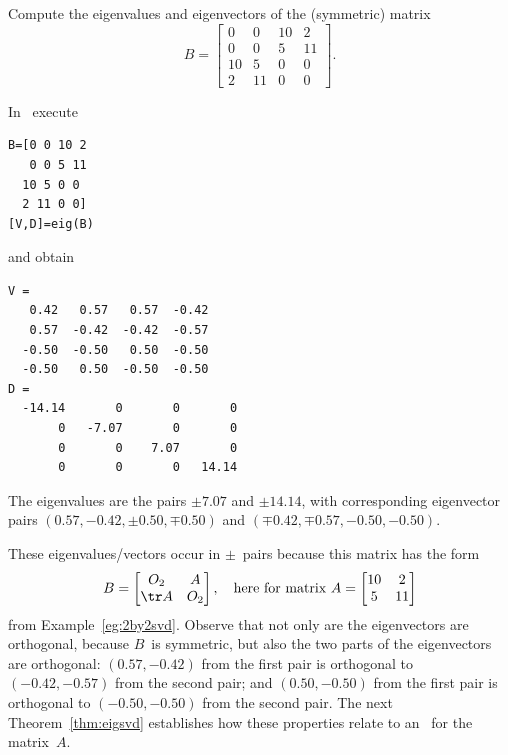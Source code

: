\begin{example} \label{eg:eigsvd}
Compute the eigenvalues and eigenvectors of the (symmetric) matrix
\begin{equation*}
B=\begin{bmatrix} 0&0&10&2\\
0&0&5&11\\
10&5&0&0\\
2&11&0&0 \end{bmatrix}.
\end{equation*}
\begin{solution} In \script\ execute
\setbox\ajrqrbox\hbox{}%
\marginpar{\usebox{\ajrqrbox}}%
\begin{verbatim}
B=[0 0 10 2
   0 0 5 11
  10 5 0 0
  2 11 0 0]
[V,D]=eig(B)
\end{verbatim}
and obtain \twodp
\begin{verbatim}
V =
   0.42   0.57   0.57  -0.42
   0.57  -0.42  -0.42  -0.57
  -0.50  -0.50   0.50  -0.50
  -0.50   0.50  -0.50  -0.50
D =
  -14.14       0       0       0
       0   -7.07       0       0
       0       0    7.07       0
       0       0       0   14.14
\end{verbatim}
The eigenvalues are the pairs \(\pm7.07\) and \(\pm14.14\), with corresponding eigenvector pairs \((0.57,-0.42,\pm0.50,\mp0.50)\) and \((\mp0.42,\mp0.57,-0.50,-0.50)\).
\end{solution}
These eigenvalues\slash vectors occur in \(\pm\)~pairs because this matrix has the form
\begin{equation*}
B=\begin{bmatrix} O_2& A\\ \tr A&O_2\end{bmatrix},
\quad\text{here for matrix }
A=\begin{bmatrix} 10&2\\5&11 \end{bmatrix}
\end{equation*}
from Example~\ref{eg:2by2svd}.
Observe that not only are the eigenvectors are orthogonal, because \(B\)~is symmetric, but also the two parts of the eigenvectors are orthogonal:  \((0.57,-0.42)\) from the first pair is orthogonal to \((-0.42,-0.57)\) from the second pair; and \((0.50,-0.50)\) from the first pair is orthogonal to \((-0.50,-0.50)\) from the second pair.
The next Theorem~\ref{thm:eigsvd} establishes how these properties relate to an \svd\ for the matrix~\(A\).
\end{example}


